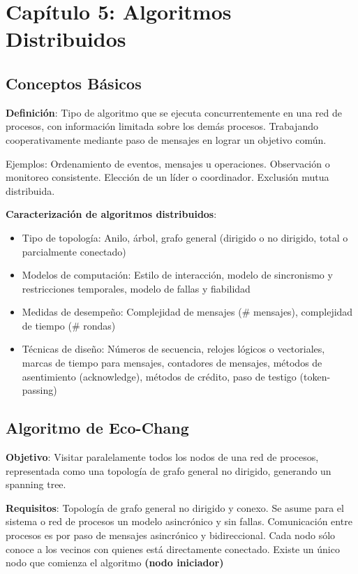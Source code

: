 \section{Capítulo 5: Algoritmos Distribuidos}
\subsection{Conceptos Básicos}

\textbf{Definición}: Tipo de algoritmo que se ejecuta concurrentemente en una red de procesos, con información limitada sobre los demás procesos. Trabajando cooperativamente mediante paso de mensajes en lograr un objetivo común.

Ejemplos: Ordenamiento de eventos, mensajes u operaciones. Observación o monitoreo consistente. Elección de un líder o coordinador. Exclusión mutua distribuida.

\textbf{Caracterización de algoritmos distribuidos}: \begin{itemize}
    \item Tipo de topología: Anilo, árbol, grafo general (dirigido o no dirigido, total o parcialmente conectado)
    \item Modelos de computación: Estilo de interacción, modelo de sincronismo y restricciones temporales, modelo de fallas y fiabilidad
    \item Medidas de desempeño: Complejidad de mensajes (\# mensajes), complejidad de tiempo (\# rondas)
    \item Técnicas de diseño: Números de secuencia, relojes lógicos o vectoriales, marcas de tiempo para mensajes, contadores de mensajes, métodos de asentimiento (acknowledge), métodos de crédito, paso de testigo (token-passing)
\end{itemize}

\subsection{\textbf{Algoritmo de Eco-Chang}}

\textbf{Objetivo}: Visitar paralelamente todos los nodos de una red de procesos, representada como una topología de grafo general no dirigido, generando un spanning tree.

\textbf{Requisitos}: Topología de grafo general no dirigido y conexo. Se asume para el sistema o red de procesos un modelo asincrónico y sin fallas. Comunicación entre procesos es por paso de mensajes asincrónico y bidireccional. Cada nodo sólo conoce a los vecinos con quienes está directamente conectado. Existe un único nodo que comienza el algoritmo \textbf{(nodo iniciador)}

